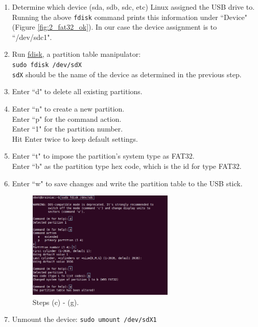 \begin{enumerate}
\begin{itemize}
\begin{enumerate}
\item Determine which device (sda, sdb, sdc, etc) Linux assigned the USB drive to. Running the above \texttt{fdisk} command prints this information under ``Device" (Figure \ref{fig:2_fat32_ok}). In our case the device assignment is to ``/dev/sdc1".\label{sec:format_usb_stick}

\item Run \href{http://linux.die.net/man/8/fdisk}{fdisk}, a partition table manipulator: \\
\texttt{sudo fdisk /dev/sdX}\\
\texttt{sdX} should be the name of the device as determined in the previous step.

\item Enter ``d" to delete all existing partitions.

\item Enter ``n" to create a new partition.\\ 
Enter ``p" for the command action.\\
Enter ``1" for the partition number.\\
Hit Enter twice to keep default settings.

\item Enter ``t" to impose the partition's system type as FAT32.\\
Enter ``b" as the partition type hex code, which is the id for type FAT32.

\item Enter ``w" to save changes and write the partition table to the USB stick.

\begin{figure}[!h]
\centering
\includegraphics[width=0.66\textwidth]{figures/2_create_partition.png}
\caption{Steps (c) - (g).}
\end{figure}

\item Unmount the device: \texttt{sudo umount /dev/sdX1}


\end{enumerate}
\end{itemize}
\end{enumerate}
